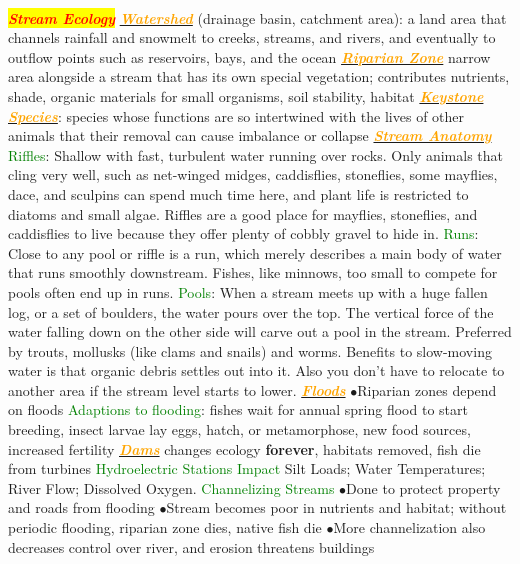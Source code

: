 \documentclass{article}
\newcommand{\ddd}{$\bullet$}
\newcommand{\red}[1]{\textcolor{red}{#1}}
\newcommand{\green}[1]{\textcolor{green}{#1}}
\newcommand{\orange}[1]{\textcolor{orange}{#1}}
\newcommand{\mysection}[1]{\colorbox{yellow}{\textbf{\textit{\red{#1}}}}}
\newcommand{\mysubsection}[1]{\underline{\textbf{{\textit{\orange{#1}}}}}}
\newcommand{\mysubsub}[1]{{{\green{#1}}}}
\begin{document}
\begin{multicols*}{4}
    \\
    \mysection{Stream Ecology}
        \mysubsection{Watershed} (drainage basin, catchment area): a land area that channels rainfall and snowmelt to creeks, streams, and rivers, and eventually to outflow points such as reservoirs, bays, and the ocean
        \mysubsection{Riparian Zone} narrow area alongside a stream that has its own special vegetation; contributes nutrients, shade, organic materials for small organisms, soil stability, habitat
        \mysubsection{Keystone Species}:  species whose functions are so intertwined with the lives of other animals that their removal can cause imbalance or collapse
        \mysubsection{Stream Anatomy} 
        	\mysubsub{Riffles}: Shallow with fast, turbulent water running over rocks. Only animals that cling very well, such as net-winged midges, caddisflies, stoneflies, some mayflies, dace, and sculpins can spend much time here, and plant life is restricted to diatoms and small algae. Riffles are a good place for mayflies, stoneflies, and caddisflies to live because they offer plenty of cobbly gravel to hide in.
        	\mysubsub{Runs}: Close to any pool or riffle is a run, which merely describes a main body of water that runs smoothly downstream. Fishes, like minnows, too small to compete for pools often end up in runs.
        	\mysubsub{Pools}: When a stream meets up with a huge fallen log, or a set of boulders, the water pours over the top. The vertical force of the water falling down on the other side will carve out a pool in the stream. Preferred by trouts, mollusks (like clams and snails) and worms. Benefits to slow-moving water is that organic debris settles out into it. Also you don't have to relocate to another area if the stream level starts to lower.
        \mysubsection{Floods}
            \ddd Riparian zones depend on floods
            \mysubsub{Adaptions to flooding}: fishes wait for annual spring flood to start breeding, insect larvae lay eggs, hatch, or metamorphose, new food sources, increased fertility
        \mysubsection{Dams}
            changes ecology \textbf{forever}, habitats removed, fish die from turbines
            \mysubsub{Hydroelectric Stations Impact}
                Silt Loads; Water Temperatures; River Flow; Dissolved Oxygen. 
            \mysubsub{Channelizing Streams}
                \ddd Done to protect property and roads from flooding
                \ddd Stream becomes poor in nutrients and habitat; without periodic flooding, riparian zone dies, native fish die
                \ddd More channelization also decreases control over river, and erosion threatens buildings

\end{multicols*}
\end{document}
